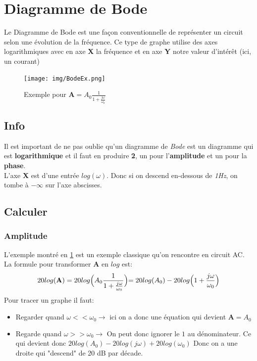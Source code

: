 \documentclass{report}
\begin{document}
\section{Diagramme de Bode}
Le Diagramme de Bode est une façon conventionnelle de représenter un circuit selon une évolution de la fréquence. Ce type de graphe utilise des axes logarithmiques avec en axe \textbf{X} la fréquence et en axe \textbf{Y} notre valeur d'intérêt (ici, un courant)

\begin{figure}[H]
\centering
\texttt{[image: img/BodeEx.png]}
\caption{Exemple pour $\textbf{A} = A_0 \frac{1}{1 + \frac{j \omega}{\omega_0}}$} \label{BodeEx}
\end{figure}

\subsection{Info}
Il est important de ne pas oublie qu'un diagramme de \textit{Bode} est un diagramme qui est \textbf{logarithmique} et il faut en produire \textbf{2}, un pour l'\textbf{amplitude} et un pour la \textbf{phase}.\\

L'axe \textbf{X} est d'une entrée $log(\omega)$. Donc si on descend en-dessous de \textit{1Hz}, on tombe à $-\infty$ sur l'axe abscisses.

\subsection{Calculer}
\subsubsection{Amplitude} \label{AmplCalc}
L'exemple montré en \ref{BodeEx} est un exemple classique qu'on rencontre en circuit AC. La formule pour transformer \textbf{A} en $log$ est:
\begin{equation}
20log(\textbf{A}) = 20 log\Bigl(A_0\frac{1}{1+\frac{j\omega}{\omega_0}}\Bigl) = 20log(A_0) - 20log\Bigl(1+ \frac{j\omega}{\omega_0}\Bigl)
\end{equation}
Pour tracer un graphe il faut:
\begin{itemize}
\item Regarder quand $\omega < < \omega_0 \rightarrow$ ici on a donc une équation qui devient $\textbf{A} = A_0$
\item Regarde quand  $\omega > > \omega_0 \rightarrow$ On peut donc ignorer le $1$ au dénominateur. Ce qui devient donc $20log(A_0) - 20log(j\omega) + 20 log(\omega_0)$ Donc on a une droite qui "descend" de 20 dB par décade.
\end{itemize}
\end{document}
